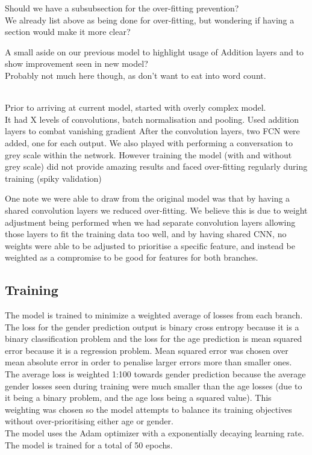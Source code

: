 \begin{notes}
    Should we have a subsubsection for the over-fitting prevention?\\
    We already list above as being done for over-fitting, but wondering if having a section would make it more clear?
\end{notes}

\begin{optional}
    \begin{notes}
        A small aside on our previous model to highlight usage of Addition layers and to show improvement seen in new model?\\
        Probably not much here though, as don't want to eat into word count.
    \end{notes}
    \\Prior to arriving at current model, started with overly complex model.\\
    It had X levels of convolutions, batch normalisation and pooling.
    Used addition layers to combat vanishing gradient
    After the convolution layers, two FCN were added, one for each output.
    We also played with performing a conversation to grey scale within the network.
    However training the model (with and without grey scale) did not provide amazing results and faced over-fitting regularly during training (spiky validation)

    One note we were able to draw from the original model was that by having a shared convolution layers we reduced over-fitting.
    We believe this is due to weight adjustment being performed when we had separate convolution layers allowing those layers to fit the training data too well, and by having shared CNN, no weights were able to be adjusted to prioritise a specific feature, and instead be weighted as a compromise to be good for features for both branches.
\end{optional}

\subsection{Training}
The model is trained to minimize a weighted average of losses from each branch. \\
The loss for the gender prediction output is binary cross entropy because it is a binary classification problem and the loss for the age prediction is mean squared error because it is a regression problem. 
Mean squared error was chosen over mean absolute error in order to penalise larger errors more than smaller ones.\\
The average loss is weighted 1:100 towards gender prediction because the average gender losses seen during training were much smaller than the age losses (due to it being a binary problem, and the age loss being a squared value).
This weighting was chosen so the model attempts to balance its training objectives without over-prioritising either age or gender.\\
The model uses the Adam optimizer with a exponentially decaying learning rate.\\
The model is trained for a total of 50 epochs.\\

